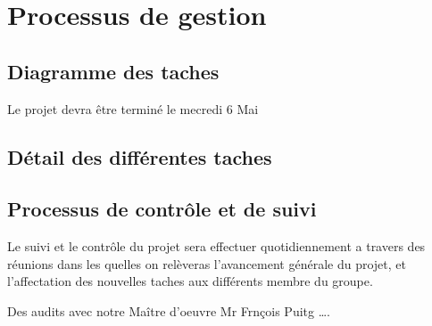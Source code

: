 \section{Processus de gestion}
\subsection{Diagramme des taches}

Le projet devra être terminé le mecredi 6 Mai

\subsection{Détail des différentes taches}


\subsection{Processus de contrôle et de suivi}

Le suivi et le contrôle du projet sera effectuer quotidiennement a travers des réunions dans les quelles on relèveras l’avancement générale du projet, et l’affectation des nouvelles taches aux différents membre du groupe.

Des audits avec notre Maître d’oeuvre Mr Frnçois Puitg  ….



